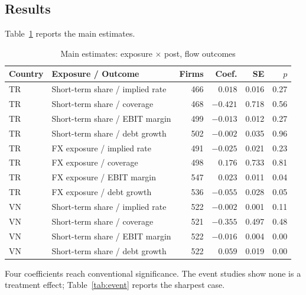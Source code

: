 \documentclass[review,12pt,authoryear]{elsarticle}
\theoremstyle{plain}
\theoremstyle{definition}
\begin{document}
\subsection{Results}
\label{sec:mainresults}

Table~\ref{tab:main} reports the main estimates.

\begin{table}[htbp]
\centering
\caption{Main estimates: exposure $\times$ post, flow outcomes}
\label{tab:main}
\begin{tabular}{llrrrr}
\toprule
Country & Exposure / Outcome & Firms & Coef. & SE & $p$ \\
\midrule
TR & Short-term share / implied rate    & 466 & $0.018$  & 0.016 & 0.27 \\
TR & Short-term share / coverage        & 468 & $-0.421$ & 0.718 & 0.56 \\
TR & Short-term share / EBIT margin     & 499 & $-0.013$ & 0.012 & 0.27 \\
TR & Short-term share / debt growth     & 502 & $-0.002$ & 0.035 & 0.96 \\
TR & FX exposure / implied rate         & 491 & $-0.025$ & 0.021 & 0.23 \\
TR & FX exposure / coverage             & 498 & $0.176$  & 0.733 & 0.81 \\
TR & FX exposure / EBIT margin          & 547 & $0.023$  & 0.011 & 0.04 \\
TR & FX exposure / debt growth          & 536 & $-0.055$ & 0.028 & 0.05 \\
VN & Short-term share / implied rate    & 522 & $-0.002$ & 0.001 & 0.11 \\
VN & Short-term share / coverage        & 521 & $-0.355$ & 0.497 & 0.48 \\
VN & Short-term share / EBIT margin     & 522 & $-0.016$ & 0.004 & 0.00 \\
VN & Short-term share / debt growth     & 522 & $0.059$  & 0.019 & 0.00 \\
\bottomrule
\end{tabular}
\end{table}

Four coefficients reach conventional significance. The event studies show none
is a treatment effect; Table~\ref{tab:event} reports the sharpest case.
\end{document}
